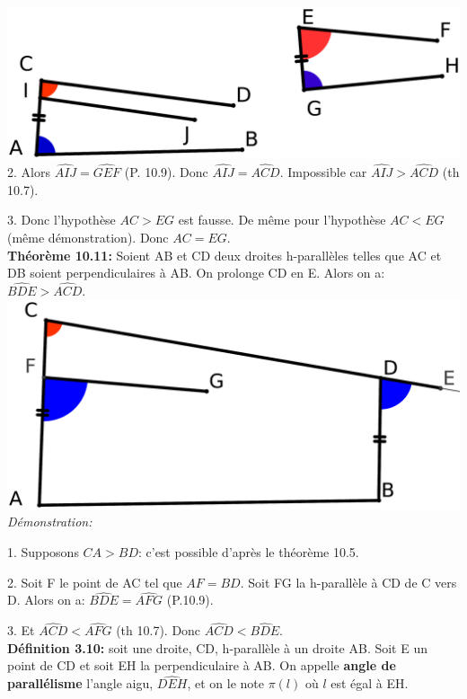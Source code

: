 \documentclass[a4paper, 12pt, twoside]{book}
\begin{document}
      \includegraphics[scale=0.2]{figures/Lobat20.eps}\\
      
     2. Alors $\hat{AIJ}=\hat{GEF}$ (P. 10.9). Donc $\hat{AIJ}=\hat{ACD}$. Impossible car  $\hat{AIJ}>\hat{ACD}$ (th 10.7).\
     
     3. Donc l'hypothèse $AC>EG$ est fausse. De même pour l'hypothèse $AC<EG$ (même démonstration). Donc $AC=EG$.\\
   
   
 \textbf{Théorème 10.11:} Soient AB et CD deux droites h-parallèles telles que AC et DB soient perpendiculaires à AB. On prolonge CD en E. Alors  on a: $\hat{BDE}>\hat{ACD}$.\\
 
  \includegraphics[scale=0.1]{figures/Lobat20bis.eps}\\
  
  \textit{Démonstration:} \
  
  1. Supposons $CA>BD$: c'est possible d'après le théorème 10.5.\
  
  2. Soit F le point de  AC tel que $AF=BD$. Soit FG la h-parallèle à CD de C vers D. Alors on a:  $\hat{BDE}=\hat{AFG}$ (P.10.9).\
  
  3. Et $\hat{ACD}<\hat{AFG}$ (th 10.7). Donc $\hat{ACD}<\hat{BDE}$.\\
  
  
   
   \textbf{Définition 3.10:} soit une droite, CD, h-parallèle à un droite AB. Soit E un point de CD et soit EH la perpendiculaire à AB. On appelle \textbf{angle de parallélisme} l'angle aigu,  $\hat{DEH}$, et on le note $\pi(l)$ où $l$ est égal à EH.\\
     
\end{document}
